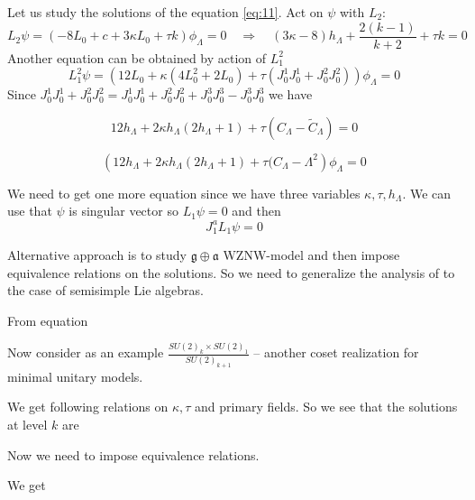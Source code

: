 \documentclass[12pt]{article}
\theoremstyle{definition}
\newcommand{\gf}{\mathfrak{g}}
\newcommand{\af}{\mathfrak{a}}
\theoremstyle{definition} \newtheorem{Def}{Definition}
\begin{document}
Let us study the solutions of the equation \eqref{eq:11}. Act on $\psi$ with $L_{2}$:
\begin{equation}
  \label{eq:13}
  L_{2}\psi=(-8L_{0}+c+3\kappa L_{0}+\tau k)\phi_{\Lambda}=0\quad \Longrightarrow\quad  (3\kappa-8) h_{\Lambda}+\frac{2(k-1)}{k+2}+\tau k =0
\end{equation}
Another equation can be obtained by action of $L_{1}^{2}$
\begin{equation}
  \label{eq:15}
  L_{1}^{2}\psi = (12 L_{0} + \kappa(4 L_{0}^{2}+2 L_{0}) +\tau (J_{0}^{1}J_{0}^{1}+J_{0}^{2}J_{0}^{2}))\phi_{\Lambda}=0
\end{equation}
Since $J_{0}^{1}J_{0}^{1}+J_{0}^{2}J_{0}^{2}=J_{0}^{1}J_{0}^{1}+J_{0}^{2}J_{0}^{2}+J_{0}^{3}J_{0}^{3}-J_{0}^{3}J_{0}^{3}$ we have

\begin{equation}
  \label{eq:17}
  12 h_{\Lambda}+2\kappa h_{\Lambda} (2h_{\Lambda}+1) +  \tau (C_{\Lambda}-\tilde{C}_{\Lambda})=0
\end{equation}

\begin{equation}
  \label{eq:16}
  \left(12 h_{\Lambda}+2\kappa h_{\Lambda} (2h_{\Lambda}+1) +  \tau (C_{\Lambda}-\Lambda^{2}\right) \phi_{\Lambda}=0
\end{equation}

We need to get one more equation since we have three variables $\kappa,\tau,h_{\Lambda}$. We can use that $\psi$ is singular vector so $L_{1}\psi=0$ and then
\begin{equation}
  \label{eq:18}
  J_{1}^{a}L_{1}\psi=0
\end{equation}


Alternative approach is to study $\gf\oplus \af$ WZNW-model and then impose equivalence relations on the solutions. 
So we need to generalize the analysis of \cite{alekseev2010sle} to the case of semisimple Lie algebras. 

From equation 

Now consider as an example $\frac{SU(2)_{k}\times SU(2)_{1}}{SU(2)_{k+1}}$ -- another coset realization for minimal unitary models. 

We get following relations on $\kappa,\tau$ and primary fields. So we see that the solutions at level $k$ are 

Now we need to impose equivalence relations.


We get 
\end{document}
